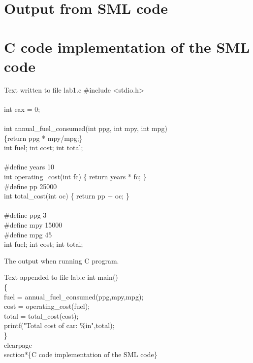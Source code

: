 \documentclass{article}
\begin{document}
\section*{Output from SML code}


\clearpage
\section*{C code implementation of the SML code}
\begin{GFT}{Text written to file lab1.c}
\+\#include <stdio.h>\\
\+\\
\+int eax = 0;\\
\+\\
\+int annual\_fuel\_consumed(int ppg, int mpy, int mpg)\\
\+	\{return ppg * mpy/mpg;\}\\
\+int fuel; int cost; int total;\\
\+\\
\+\#define years 10\\
\+int operating\_cost(int fc) \{ return years * fc; \}\\
\+\#define pp 25000\\
\+int total\_cost(int oc) \{ return pp + oc; \}\\
\+\\
\+\#define ppg 3\\
\+\#define mpy 15000\\
\+\#define mpg 45\\
\+int fuel; int cost; int total;\\
\end{GFT}
\clearpage
The output when running C program.
\begin{GFT}{Text appended to file lab.c}
\+int main()\\
\+\{\\
\+	fuel = annual\_fuel\_consumed(ppg,mpy,mpg);\\
\+	cost = operating\_cost(fuel);\\
\+	total = total\_cost(cost);\\
\+	printf("Total cost of car: \%i\Backslash{}n",total);\\
\+\}\\
\+\Backslash{}clearpage\\
\+\Backslash{}section*\{C code implementation of the SML code\}\\
\end{GFT}
\end{document}
